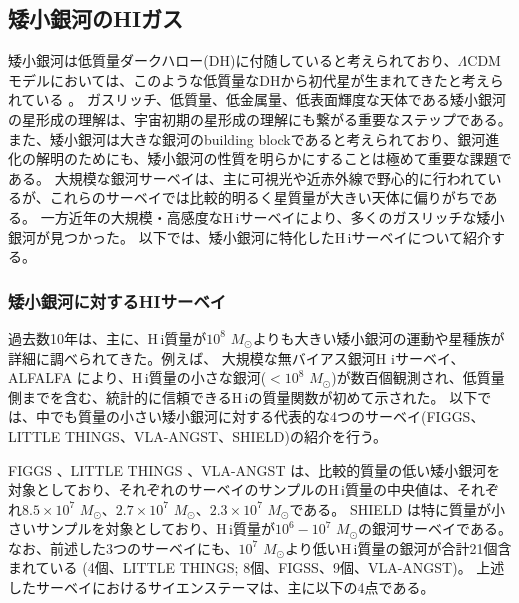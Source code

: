 \subsection{矮小銀河のHIガス}
\label{sec:矮小銀河のHIガス}

矮小銀河は低質量ダークハロー(DH)に付随していると考えられており、$\Lambda$CDMモデルにおいては、このような低質量なDHから初代星が生まれてきたと考えられている \citep{2006ApJ...652....6Y,2008Sci...321..669Y}。
ガスリッチ、低質量、低金属量、低表面輝度な天体である矮小銀河の星形成の理解は、宇宙初期の星形成の理解にも繋がる重要なステップである。
また、矮小銀河は大きな銀河のbuilding blockであると考えられており、銀河進化の解明のためにも、矮小銀河の性質を明らかにすることは極めて重要な課題である。
大規模な銀河サーベイは、主に可視光や近赤外線で野心的に行われているが、これらのサーベイでは比較的明るく星質量が大きい天体に偏りがちである。
一方近年の大規模・高感度なH\,{\sc i}サーベイにより、多くのガスリッチな矮小銀河が見つかった。
以下では、矮小銀河に特化したH\,{\sc i}サーベイについて紹介する。


\subsubsection{矮小銀河に対するHIサーベイ}

過去数10年は、主に、H\,{\sc i}質量が$10^8$ $M_\odot$よりも大きい矮小銀河の運動や星種族が詳細に調べられてきた。例えば、
大規模な無バイアス銀河H {\sc i}サーベイ、ALFALFA \citep{2005AJ....130.2598G} により、H\,{\sc i}質量の小さな銀河($<10^8$ $M_\odot$)が数百個観測され、低質量側までを含む、統計的に信頼できるH\,{\sc i}の質量関数が初めて示された\citep{2010ApJ...723.1359M}。
以下では、中でも質量の小さい矮小銀河に対する代表的な4つのサーベイ(FIGGS、LITTLE THINGS、VLA-ANGST、SHIELD)の紹介を行う。

FIGGS \citep{2008MNRAS.386.1667B}、LITTLE THINGS \citep{2012AJ....144..134H}、VLA-ANGST \citep{2012AJ....144..123O}は、比較的質量の低い矮小銀河を対象としており、それぞれのサーベイのサンプルのH\,{\sc i}質量の中央値は、それぞれ$8.5\times10^7$ $M_\odot$、$2.7\times10^7$ $M_\odot$、$2.3\times10^7$ $M_\odot$である。
SHIELD \citep{2011ApJ...739L..22C}は特に質量が小さいサンプルを対象としており、H\,{\sc i}質量が$10^6-10^7$ $M_\odot$の銀河サーベイである。
なお、前述した3つのサーベイにも、$10^7$ $M_\odot$より低いH\,{\sc i}質量の銀河が合計21個含まれている (4個、LITTLE THINGS; 8個、FIGSS、9個、VLA-ANGST)。
上述したサーベイにおけるサイエンステーマは、主に以下の4点である。

